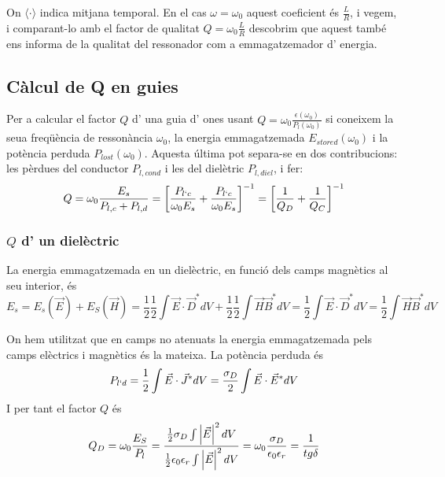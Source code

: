 On $\langle \cdot \rangle$ indica mitjana temporal. En el cas $\omega = \omega _0$ aquest coeficient és $\frac{L}{R}$, i vegem, i comparant-lo amb el factor de qualitat $Q = \omega _0 \frac{L}{R}$ descobrim que aquest també ens informa de la qualitat del ressonador com a emmagatzemador d' energia.

\subsection{Càlcul de Q en guies}

Per a calcular el factor $Q$ d' una guia d' ones usant $Q = \omega _0 \frac{\epsilon(\omega _0)}{P_l(\omega_0)}$ si coneixem la seua freqüència de ressonància $\omega _0$, la energia emmagatzemada $E_{stored} (\omega_0)$ i la potència perduda $P_{lost} (\omega _0)$. Aquesta última pot separa-se en dos contribucions: les pèrdues del conductor $P_{l,cond}$ i les del dielètric $P_{l,diel}$, i fer:
\begin{equation}
Q = \omega _0 \frac{E_s}{P_{l,c} + P_{l,d}} = \left [ \frac{P_{l`c}}{\omega_0 E_s }+\frac{P_{l`c}}{\omega _0 E_s} \right ] ^{-1} = \left [ \frac{1}{Q_D }+\frac{1}{Q_C} \right ] ^{-1}
\end{equation}

\subsubsection*{$Q$ d' un dielèctric}

La energia emmagatzemada en un dielèctric, en funció dels camps magnètics al seu interior, és
\begin{equation}
E_s = E_s(\vec E) + E_S(\vec H) = \frac{1}{2}\frac{1}{2} \int \vec E \cdot \vec D ^{*} dV + \frac{1}{2}\frac{1}{2} \int \vec H \vec B ^{*}dV = \frac{1}{2} \int \vec E \cdot \vec D^{*} dV = \frac{1}{2} \int \vec H \vec B ^{*} dV
\end{equation}

On hem utilitzat que en camps no atenuats la energia emmagatzemada pels camps elèctrics i magnètics és la mateixa. La potència perduda és
\begin{equation}
P_{l`d} = \frac{1}{2} \int \vec E \cdot \vec J ^{*} dV = \frac{\sigma_D}{2} \int \vec E \cdot \vec E ^{*} dV
\end{equation}
I per tant el factor $Q$ és
\begin{equation}
  Q_D = \omega _0 \frac{E_S}{P_l} = \frac{\frac{1}{2} \sigma _D \int \left\rvert \vec E \right\lvert ^2 dV}{\frac{1}{2} \epsilon_0 \epsilon _r \int \left\rvert \vec E \right\lvert ^2 dV} = \omega _0 \frac{\sigma _D}{\epsilon _0 \epsilon _r} = \frac{1}{tg\delta}
\end{equation}

